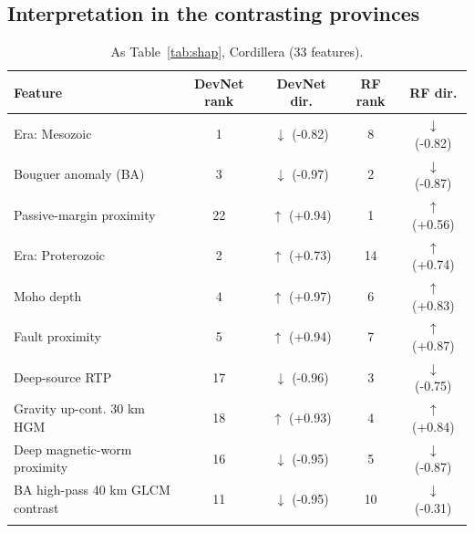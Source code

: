 \documentclass[pdflatex,sn-apa]{sn-jnl}
\begin{document}
\begin{appendices}
\section{Interpretation in the contrasting provinces}\label{app:shap}

\begin{table}[!h]
\caption{As Table~\ref{tab:shap}, Cordillera (33 features).}\label{tab:shap-cord}
\footnotesize
\begin{tabular*}{\textwidth}{@{\extracolsep\fill}lcccc}
\toprule
Feature & DevNet rank & DevNet dir. & RF rank & RF dir. \\
\midrule
Era: Mesozoic & 1 & $\downarrow$ (-0.82) & 8 & $\downarrow$ (-0.82) \\
Bouguer anomaly (BA) & 3 & $\downarrow$ (-0.97) & 2 & $\downarrow$ (-0.87) \\
Passive-margin proximity & 22 & $\uparrow$ (+0.94) & 1 & $\uparrow$ (+0.56) \\
Era: Proterozoic & 2 & $\uparrow$ (+0.73) & 14 & $\uparrow$ (+0.74) \\
Moho depth & 4 & $\uparrow$ (+0.97) & 6 & $\uparrow$ (+0.83) \\
Fault proximity & 5 & $\uparrow$ (+0.94) & 7 & $\uparrow$ (+0.87) \\
Deep-source RTP & 17 & $\downarrow$ (-0.96) & 3 & $\downarrow$ (-0.75) \\
Gravity up-cont. 30 km HGM & 18 & $\uparrow$ (+0.93) & 4 & $\uparrow$ (+0.84) \\
Deep magnetic-worm proximity & 16 & $\downarrow$ (-0.95) & 5 & $\downarrow$ (-0.87) \\
BA high-pass 40 km GLCM contrast & 11 & $\downarrow$ (-0.95) & 10 & $\downarrow$ (-0.31) \\
\botrule
\end{tabular*}
\end{table}


\end{appendices}
\end{document}
